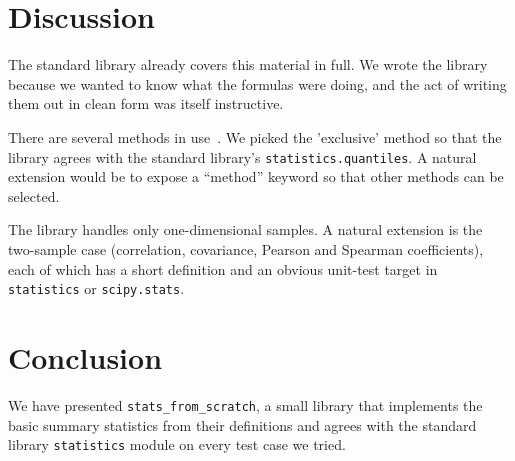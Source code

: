 \documentclass[11pt]{article}
\begin{document}
\section{Discussion}

The standard library already covers
this material in full. We wrote the library because we wanted to
know what the formulas were doing, and the act of writing them out
in clean form was itself instructive.

There are several methods in
use~\cite{rice2007}. We picked the 'exclusive' method so that the
library agrees with the standard library's
\texttt{statistics.quantiles}. A natural extension would be to
expose a ``method'' keyword so that other methods can be selected.

The library handles only one-dimensional
samples. A natural extension is the two-sample case (correlation,
covariance, Pearson and Spearman coefficients), each of which has a
short definition and an obvious unit-test target in
\texttt{statistics} or \texttt{scipy.stats}.

\section{Conclusion}

We have presented \texttt{stats\_from\_scratch}, a small library
that implements the basic summary statistics from their definitions
and agrees with the standard library \texttt{statistics} module on
every test case we tried.



\end{document}
